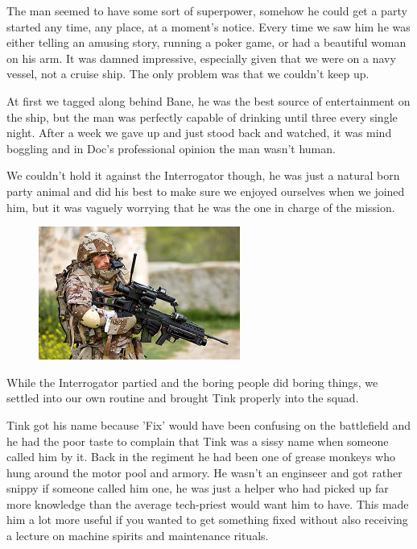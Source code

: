 The man seemed to have some sort of superpower, somehow he could get a party started any time, any place, at a moment's notice. 
Every time we saw him he was either telling an amusing story, running a poker game, or had a beautiful woman on his arm. 
It was damned impressive, especially given that we were on a navy vessel, not a cruise ship. 
The only problem was that we couldn't keep up.

At first we tagged along behind Bane, he was the best source of entertainment on the ship, but the man was perfectly capable of drinking until three every single night. 
After a week we gave up and just stood back and watched, it was mind boggling and in Doc's professional opinion the man wasn't human. 


We couldn't hold it against the Interrogator though, he was just a natural born party animal and did his best to make sure we enjoyed ourselves when we joined him, but it was vaguely worrying that he was the one in charge of the mission.

\begin{figure}
	\begin{center}
		\includegraphics[width=\figwidth]{pics/9/7.png}
	\end{center}
\end{figure}
While the Interrogator partied and the boring people did boring things, we settled into our own routine and brought Tink properly into the squad.

Tink got his name because 'Fix' would have been confusing on the battlefield and he had the poor taste to complain that Tink was a sissy name when someone called him by it. 
Back in the regiment he had been one of grease monkeys who hung around the motor pool and armory. 
He wasn't an enginseer and got rather snippy if someone called him one, he was just a helper who had picked up far more knowledge than the average tech-priest would want him to have. 
This made him a lot more useful if you wanted to get something fixed without also receiving a lecture on machine spirits and maintenance rituals.

